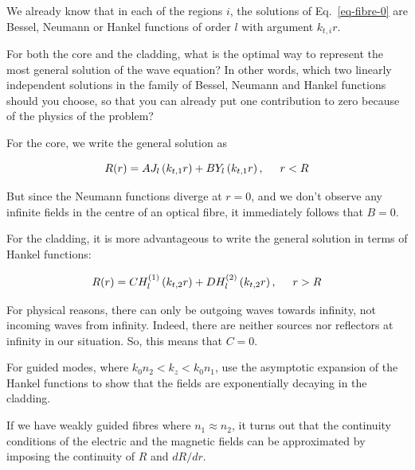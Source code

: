 We already know that in each of the regions $i$, the solutions of Eq.~\ref{eq-fibre-0} are Bessel, Neumann or Hankel functions of order $l$ with argument $k_{t,i} r$.

\begin{cue}
For both the core and the cladding, what is the optimal way to represent the most general solution of the wave equation? In other words, which two linearly independent solutions in the family of Bessel, Neumann and Hankel functions should you choose, so that you can already put one contribution to zero because of the physics of the problem?
\end{cue}

For the core, we write the general solution as

\begin{equation}
R(r) = A J_l\left(k_{t,1}r\right) + B Y_l\left(k_{t,1}r\right), \hspace{0.5 cm} r<R \label{eq-fibre-1}
\end{equation} 

But since the Neumann functions diverge at $r=0$, and we don't observe any infinite fields in the centre of an optical fibre, it immediately follows that $B=0$.

For the cladding, it is more advantageous to write the general solution in terms of Hankel functions:

\begin{equation}
R(r) = C H_l^{(1)}\left(k_{t,2}r\right) + D H_l^{(2)}\left(k_{t,2}r\right), \hspace{0.5 cm} r>R \label{eq-fibre-2}
\end{equation} 

For physical reasons, there can only be outgoing waves towards infinity, not incoming waves from infinity. Indeed, there are neither sources nor reflectors at infinity in our situation. So, this means that $C=0$.

\begin{exer}
For guided modes, where $k_0 n_2 < k_z < k_0 n_1$, use the asymptotic expansion of the Hankel functions to show that the fields are exponentially decaying in the cladding.
\end{exer}

If we have weakly guided fibres where $n_1 \approx n_2$, it turns out that the continuity conditions of the electric and the magnetic fields can be approximated by imposing the continuity of $R$ and $d R / d r$.

